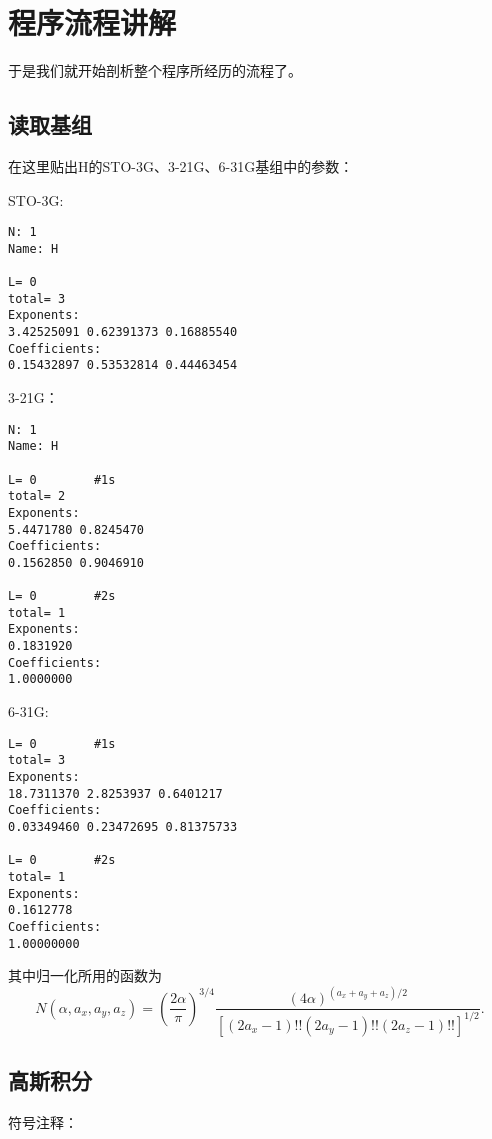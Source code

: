 \documentclass[12pt,a4paper,openany,twoside]{article}
\numberwithin{equation}{section}
\begin{document}
        \section{程序流程讲解}
        于是我们就开始剖析整个程序所经历的流程了。

            \subsection{读取基组}
            在这里贴出H的STO-3G、3-21G、6-31G基组中的参数\cite{schuchardt2007basis}：

            STO-3G:
            \begin{lstlisting}
N: 1
Name: H

L= 0
total= 3
Exponents:
3.42525091 0.62391373 0.16885540
Coefficients:
0.15432897 0.53532814 0.44463454
            \end{lstlisting}

            3-21G：
            \begin{lstlisting}
N: 1
Name: H

L= 0        #1s
total= 2
Exponents:
5.4471780 0.8245470
Coefficients:
0.1562850 0.9046910

L= 0        #2s
total= 1
Exponents:
0.1831920
Coefficients:
1.0000000
            \end{lstlisting}

            6-31G:
            \begin{lstlisting}
L= 0        #1s
total= 3
Exponents:
18.7311370 2.8253937 0.6401217
Coefficients:
0.03349460 0.23472695 0.81375733

L= 0        #2s
total= 1
Exponents:
0.1612778
Coefficients:
1.00000000
            \end{lstlisting}

            
            其中归一化所用的函数为\cite{obara1986efficient}
            \begin{equation}
                N(\alpha,a_x,a_y,a_z) = \left(\frac{2 \alpha}{\pi}\right)^{3/4} \frac{(4\alpha)^{(a_x+a_y+a_z)/2}}{[(2a_x-1)!!(2a_y-1)!!(2a_z-1)!!]^{1/2}}.
            \end{equation}
            \subsection{高斯积分}
            符号注释：
\end{document}

